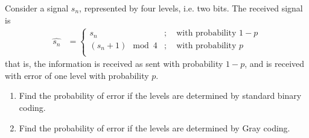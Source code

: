 \documentclass[titlepage, fleqn, a4paper, 12pt, twoside]{article}
\theoremstyle{definition}
\theoremstyle{theorem}
\renewcommand{\hat}{\widehat}
\begin{document}
\begin{question}
	Consider a signal $s_n$, represented by four levels, i.e. two bits.
	The received signal is
	\begin{align*}
		\hat{s_n} &=
			\begin{cases}
				s_n &;\quad \text{with probability $1 - p$}\\
				(s_n + 1) \mod 4 &;\quad \text{with probability $p$}\\
			\end{cases}
	\end{align*}
	that is, the information is received as sent with probability $1 - p$, and is received with error of one level with probability $p$.
	\begin{enumerate}
		\item
			Find the probability of error if the levels are determined by standard binary coding.
		\item
			Find the probability of error if the levels are determined by Gray coding.
	\end{enumerate}
\end{question}
\end{document}
